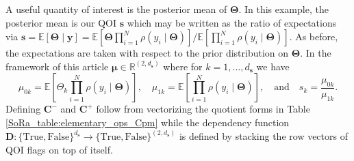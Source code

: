 \documentclass[graybox]{svmult}
\begin{document}
A useful quantity of interest is the posterior mean of $\boldsymbol{\Theta}$. In this example, the posterior mean is our QOI $\boldsymbol{s}$ which may be written as the ratio of expectations via $\boldsymbol{s} = \mathbb{E}\left[\boldsymbol{\Theta} \mid \boldsymbol{y}\right] = \mathbb{E}\left[\boldsymbol{\Theta} \prod_{i=1}^{N} \rho(y_i \mid \boldsymbol{\Theta})\right]/\mathbb{E}\left[\prod_{i=1}^{N} \rho(y_i \mid \boldsymbol{\Theta})\right]$. As before, the expectations are taken with respect to the prior distribution on $\boldsymbol{\Theta}$. In the framework of this article $\boldsymbol{\mu} \in \mathbb{R}^{(2, d_{\boldsymbol{s}})}$ where for $k=1,\dots,d_{\boldsymbol{s}}$ we have 
$$\mu_{0k} = \mathbb{E}\left[\Theta_k \prod_{i=1}^{N} \rho(y_i \mid \boldsymbol{\Theta})\right], \quad \mu_{1k} = \mathbb{E}\left[\prod_{i=1}^{N} \rho(y_i \mid \boldsymbol{\Theta})\right], \quad \text{and} \quad s_k = \frac{\mu_{0k}}{\mu_{1k}}.$$
Defining $\boldsymbol{C}^-$ and $\boldsymbol{C}^+$ follow from vectorizing the quotient forms in Table \ref{SoRa_table:elementary_ops_Cpm} while the dependency function $\boldsymbol{D}: \{\text{True},\text{False}\}^{d_{\boldsymbol{s}}} \to \{\text{True},\text{False}\}^{(2, d_{\boldsymbol{s}})}$ is defined by stacking the row vectors of QOI flags on top of itself. 


\end{document}

